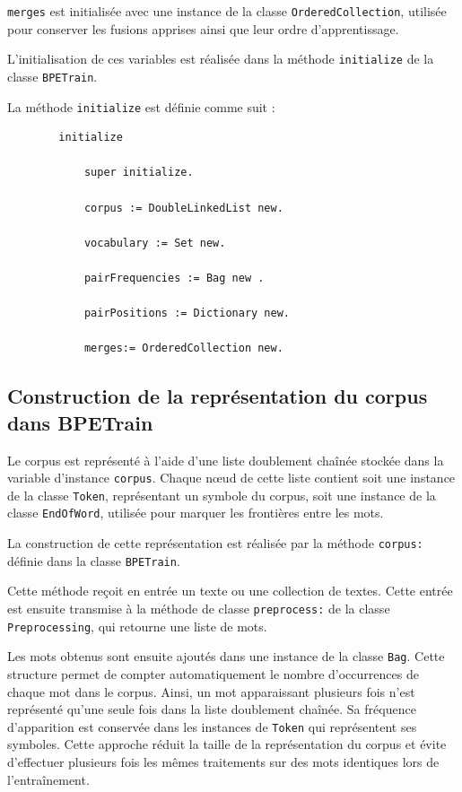 \documentclass[12pt,a4paper]{report}
\begin{document}
	\texttt{merges} est initialisée avec une instance de la classe \texttt{OrderedCollection}, utilisée pour conserver les fusions apprises ainsi que leur ordre d'apprentissage.
	
	L'initialisation de ces variables est réalisée dans la méthode \texttt{initialize} de la classe \texttt{BPETrain}.
	
	La méthode \texttt{initialize} est définie comme suit :
	
	\begin{verbatim}
		initialize 
			
			super initialize. 	
			
			corpus := DoubleLinkedList new.	
			
			vocabulary := Set new.	
			
			pairFrequencies := Bag new .
				
			pairPositions := Dictionary new.
				
			merges:= OrderedCollection new.
	\end{verbatim}
	
	\subsection{Construction de la représentation du corpus dans BPETrain}
	
	Le corpus est représenté à l'aide d'une liste doublement chaînée stockée dans la variable d'instance \texttt{corpus}. Chaque nœud de cette liste contient soit une instance de la classe \texttt{Token}, représentant un symbole du corpus, soit une instance de la classe \texttt{EndOfWord}, utilisée pour marquer les frontières entre les mots.
	
	La construction de cette représentation est réalisée par la méthode \texttt{corpus:} définie dans la classe \texttt{BPETrain}.
	
	Cette méthode reçoit en entrée un texte ou une collection de textes. Cette entrée est ensuite transmise à la méthode de classe \texttt{preprocess:} de la classe \texttt{Preprocessing}, qui retourne une liste de mots.
	
	Les mots obtenus sont ensuite ajoutés dans une instance de la classe \texttt{Bag}. Cette structure permet de compter automatiquement le nombre d'occurrences de chaque mot dans le corpus. Ainsi, un mot apparaissant plusieurs fois n'est représenté qu'une seule fois dans la liste doublement chaînée. Sa fréquence d'apparition est conservée dans les instances de \texttt{Token} qui représentent ses symboles. Cette approche réduit la taille de la représentation du corpus et évite d'effectuer plusieurs fois les mêmes traitements sur des mots identiques lors de l'entraînement.
	
\end{document}
